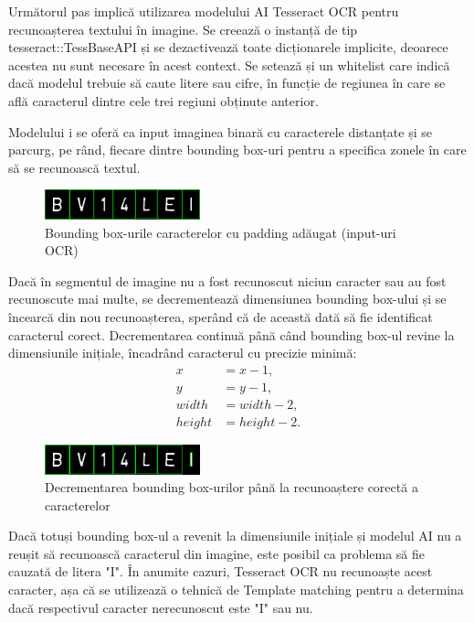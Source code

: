 \documentclass[a4paper,12pt]{report}
\begin{document}
Următorul pas implică utilizarea modelului AI Tesseract OCR pentru recunoașterea textului în imagine. Se creează o instanță de tip tesseract::TessBaseAPI și se dezactivează toate dicționarele implicite, deoarece acestea nu sunt necesare în acest context. Se setează și un whitelist care indică dacă modelul trebuie să caute litere sau cifre, în funcție de regiunea în care se află caracterul dintre cele trei regiuni obținute anterior.

Modelului i se oferă ca input imaginea binară cu caracterele distanțate și se parcurg, pe rând, fiecare dintre bounding box-uri pentru a specifica zonele în care să se recunoască textul.

\begin{figure}[h!]
    \centering
    \includegraphics[width=0.4\textwidth]{images/input_ocr.jpg}
    \caption{Bounding box-urile caracterelor cu padding adăugat (input-uri OCR) }
\end{figure}
\FloatBarrier

Dacă în segmentul de imagine nu a fost recunoscut niciun caracter sau au fost recunoscute mai multe, se decrementează dimensiunea bounding box-ului și se încearcă din nou recunoașterea, sperând că de această dată să fie identificat caracterul corect. Decrementarea continuă până când bounding box-ul revine la dimensiunile inițiale, încadrând caracterul cu precizie minimă:
\[
    \begin{aligned}
        x      & = x - 1,      \\
        y      & = y - 1,      \\
        width  & = width - 2,  \\
        height & = height - 2.
    \end{aligned}
\]

\begin{figure}[h!]
    \centering
    \includegraphics[width=0.4\textwidth]{images/output_ocr.jpg}
    \caption{Decrementarea bounding box-urilor până la recunoaștere corectă a caracterelor}
\end{figure}
\FloatBarrier

Dacă totuși bounding box-ul a revenit la dimensiunile inițiale și modelul AI nu a reușit să recunoască caracterul din imagine, este posibil ca problema să fie cauzată de litera "I". În anumite cazuri, Tesseract OCR nu recunoaște acest caracter, așa că se utilizează o tehnică de Template matching pentru a determina dacă respectivul caracter nerecunoscut este "I" sau nu.
\end{document}
